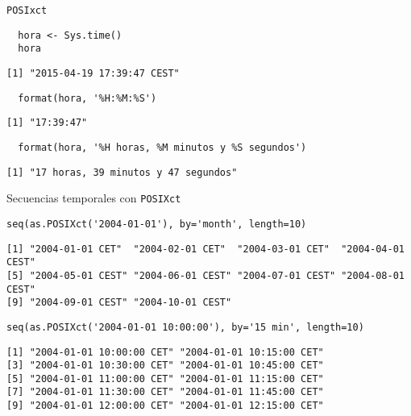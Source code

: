 \documentclass[xcolor={usenames,svgnames,dvipsnames}]{beamer}
\begin{document}
\begin{frame}[fragile,label=sec-2-4]{\texttt{POSIxct}}
 \lstset{language=R,label= ,caption= ,numbers=none}
\begin{lstlisting}
  hora <- Sys.time()
  hora
\end{lstlisting}

\begin{verbatim}
[1] "2015-04-19 17:39:47 CEST"
\end{verbatim}

\lstset{language=R,label= ,caption= ,numbers=none}
\begin{lstlisting}
  format(hora, '%H:%M:%S')
\end{lstlisting}

\begin{verbatim}
[1] "17:39:47"
\end{verbatim}

\lstset{language=R,label= ,caption= ,numbers=none}
\begin{lstlisting}
  format(hora, '%H horas, %M minutos y %S segundos')
\end{lstlisting}

\begin{verbatim}
[1] "17 horas, 39 minutos y 47 segundos"
\end{verbatim}
\end{frame}

\begin{frame}[fragile,label=sec-2-5]{Secuencias temporales con \texttt{POSIXct}}
 \lstset{language=R,label= ,caption= ,numbers=none}
\begin{lstlisting}
seq(as.POSIXct('2004-01-01'), by='month', length=10)
\end{lstlisting}

\begin{verbatim}
[1] "2004-01-01 CET"  "2004-02-01 CET"  "2004-03-01 CET"  "2004-04-01 CEST"
[5] "2004-05-01 CEST" "2004-06-01 CEST" "2004-07-01 CEST" "2004-08-01 CEST"
[9] "2004-09-01 CEST" "2004-10-01 CEST"
\end{verbatim}

\lstset{language=R,label= ,caption= ,numbers=none}
\begin{lstlisting}
seq(as.POSIXct('2004-01-01 10:00:00'), by='15 min', length=10)
\end{lstlisting}

\begin{verbatim}
[1] "2004-01-01 10:00:00 CET" "2004-01-01 10:15:00 CET"
[3] "2004-01-01 10:30:00 CET" "2004-01-01 10:45:00 CET"
[5] "2004-01-01 11:00:00 CET" "2004-01-01 11:15:00 CET"
[7] "2004-01-01 11:30:00 CET" "2004-01-01 11:45:00 CET"
[9] "2004-01-01 12:00:00 CET" "2004-01-01 12:15:00 CET"
\end{verbatim}
\end{frame}
\end{document}
